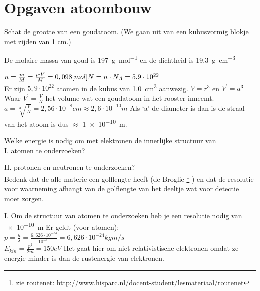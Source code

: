 \section{Opgaven atoombouw}
\begin{questions}
\question
Schat de grootte van een goudatoom. (We gaan uit van een kubusvormig blokje met 
zijden van 1 cm.)

\begin{figure}[h]
\end{figure}

De molaire massa van goud is \SI{197}{\gram\per\mol} en de dichtheid is 
\SI{19.3}{\gram\per\cubic\centi\meter}


$n = \frac{m}{M} = \frac{\rho \cdot V}{M} = 0,098 [mol]\\
N = n \cdot N_{A} = 5.9\cdot10^{22}$ \\
Er zijn $5,9\cdot 10^{22}$ atomen in de kubus van \SI{1.0}{\cubic\centi\meter} aanwezig.
$V = r^3 $ en $V^{'} = a^{3}$ \\Waar $V^{'} = \frac{V}{N}$ het volume wat een goudatoom in het rooster inneemt.\\
$a = \sqrt[3]{\frac{V}{N}} = 2,56\cdot 10^{-8} cm \approx 2,6 \cdot 10^{-10} m$
Als `a' de diameter is dan is de straal van het atoom is dus $\approx$ \SI{1e-10}{\meter}.

\question
Welke energie is nodig om met elektronen de innerlijke structuur van \\
I. atomen te onderzoeken?\\

II. protonen en neutronen te onderzoeken?\\
Bedenk dat de alle materie een golflengte heeft (de Broglie \footnote{zie routenet: \url{http://www.hisparc.nl/docent-student/lesmateriaal/routenet}}
) en dat de resolutie voor waarneming afhangt van de golflengte van het deeltje wat voor detectie moet zorgen.

I. Om de structuur van atomen te onderzoeken heb je een resolutie nodig van \SI{e-10}{\meter}
Er geldt (voor atomen):\\
$p = \frac{h}{\lambda} = \frac{6,626\cdot 10^{-34}}{10^{-10}} = 6,626 \cdot 10^{-24} kgm/s$\\
$E_{kin} = \frac{p^2}{2m} = 150 eV$
Het gaat hier om niet relativistische elektronen omdat ze energie minder is dan de rustenergie van elektronen.


\end{questions}
